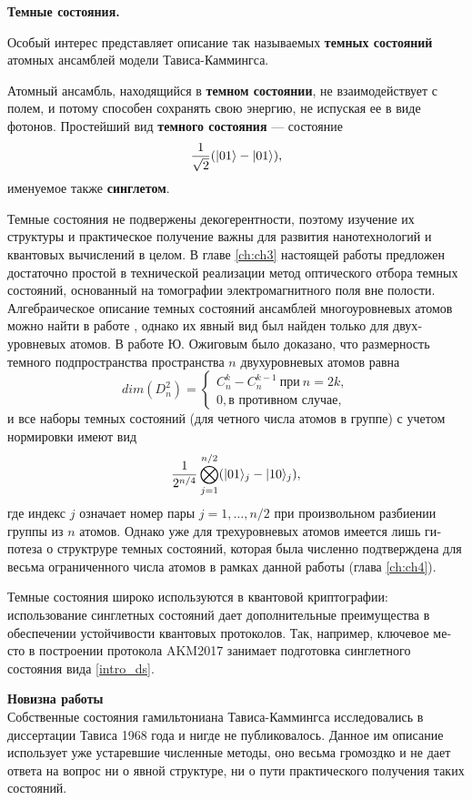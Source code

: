 \clearpage
\indent\textbf{Темные состояния.}

Особый интерес представляет описание так называемых \textbf{темных состояний} \cite{dark_states_kok,dark_states_dimension} атомных ансамблей модели Тависа-Каммингса.

Атомный ансамбль, находящийся в \textbf{темном состоянии}, не взаимодействует с полем, и потому способен сохранять свою энергию, не испуская ее в виде фотонов. Простейший вид \textbf{темного состояния} --- состояние 
\begin{equation}\label{intro_ds}
	\frac{1}{\sqrt{2}}(|01\rangle - |01\rangle),
\end{equation}
именуемое также \textbf{синглетом}.

Темные состояния не подвержены декогерентности, поэтому изучение их структуры и практическое получение важны для развития нанотехнологий и квантовых вычислений в целом. В главе \ref{ch:ch3} настоящей работы предложен до­статочно простой в технической реализации метод оптического отбора темных состояний, основанный на томографии электромагнитного поля вне полости. Алгебраическое описание темных состояний ансамблей многоуровневых атомов можно найти в работе \cite{dark_states_kok}, однако их явный вид был найден только для двух­ уровневых атомов. В работе \cite{dark_states_dimension} Ю. Ожиговым было доказано, что размерность темного подпространства пространства $n$ двухуровневых атомов равна
\[
dim(D_{n}^2) =	
\begin{cases}
	C_{n}^{k} - C_{n}^{k-1}~\text{при}~n = 2k, \\
	0, \text{в противном случае},
\end{cases}
\]
и все наборы темных состояний (для четного числа атомов в группе) с учетом нормировки имеют вид 
\[
\frac{1}{2^{n/4}}\bigotimes_{j=1}^{n/2}(|01\rangle_{j}-|10\rangle_{j}),
\]
где индекс $j$ означает номер пары $j = 1,\dots, n/2$ при произвольном разбиении группы из $n$ атомов. Однако уже для трехуровневых атомов имеется лишь ги­потеза о структруре темных состояний, которая была численно подтверждена для весьма ограниченного числа атомов в рамках данной работы (глава \ref{ch:ch4}).

Темные состояния широко используются в квантовой криптографии: использование синглетных состояний дает дополнительные преимущества в обеспечении устойчивости квантовых протоколов. Так, например, ключевое ме­ сто в построении протокола AKM2017 \cite{akm2017} занимает подготовка синглетного состояния вида \eqref{intro_ds}.

\clearpage
\textbf{Новизна работы}\\
\indent Собственные состояния гамильтониана Тависа-Каммингса исследовались в диссертации Тависа \cite{tc_exact_solution} 1968 года и нигде не публиковалось. Данное им опи­сание использует уже устаревшие численные методы, оно весьма громоздко и не дает ответа на вопрос ни о явной структуре, ни о пути практического по­лучения таких состояний.

